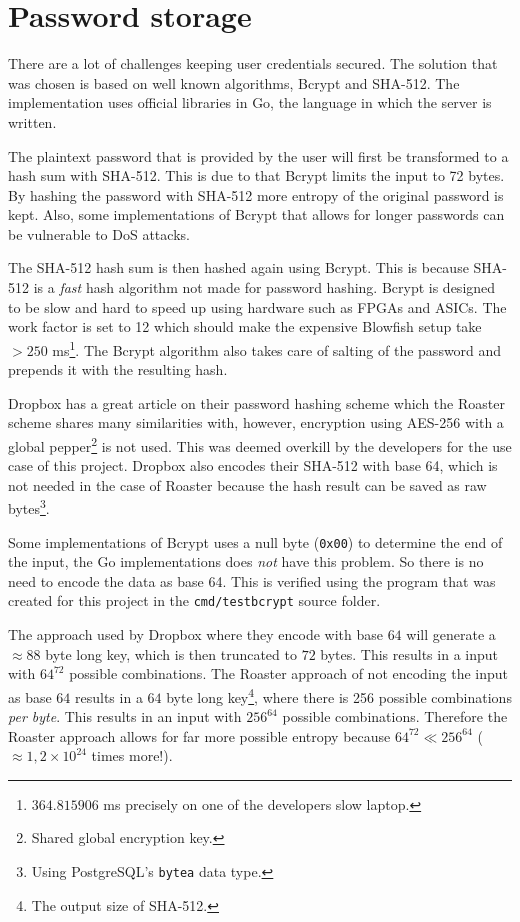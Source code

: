 \documentclass[12pt,a4paper]{report}
\begin{document}
\section{Password storage}
There are a lot of challenges keeping user credentials secured. The solution that was chosen is based on well known algorithms, Bcrypt and SHA-512. The implementation uses official libraries in Go, the language in which the server is written.

The plaintext password that is provided by the user will first be transformed to a hash sum with SHA-512. This is due to that Bcrypt limits the input to 72 bytes. By hashing the password with SHA-512 more entropy of the original password is kept. Also, some implementations of Bcrypt that allows for longer passwords can be vulnerable to DoS attacks\cite{bcrypt-length}.

The SHA-512 hash sum is then hashed again using Bcrypt. This is because
SHA-512 is a \textit{fast} hash algorithm not made for password hashing. Bcrypt is
designed to be slow and hard to speed up using hardware such as FPGAs and
ASICs. The work factor is set to 12 which should make the expensive Blowfish
setup take $> 250$ ms\footnote{$364.815906$ ms precisely on one of the developers slow laptop.}.
The Bcrypt algorithm also takes care of salting of the password and prepends
it with the resulting hash.


Dropbox has a great article\cite{dropbox-passwords} on their password hashing scheme
which the Roaster scheme shares many similarities with, however, encryption using AES-256
with a global pepper\footnote{Shared global encryption key.} is not used. This was deemed overkill
by the developers for the use case of this project. Dropbox also encodes their SHA-512 with base 64,
which is not needed in the case of Roaster because the hash result can be saved as raw
bytes\footnote{Using PostgreSQL's \texttt{bytea} data type.}.

Some implementations of Bcrypt uses a null byte (\texttt{0x00}) to determine the end
of the input\cite{bcrypt-bug}, the Go implementations does \textit{not} have this problem. So there
is no need to encode the data as base 64. This is verified using the program that was created for
this project in the \texttt{cmd/testbcrypt} source folder.

The approach used by Dropbox where they encode with base $64$ will generate a
$\approx 88$ byte long key, which is then truncated to $72$ bytes. This results in a
input with $64^{72}$ possible combinations. The Roaster approach of not encoding the
input as base $64$ results in a $64$ byte long key\footnote{The output size of SHA-512.},
where there is 256 possible combinations \textit{per byte}. This results in an input
with $256^{64}$ possible combinations. Therefore the Roaster approach allows for far more
possible entropy because $64^{72} \ll 256^{64}$ ($\approx 1,2 \times 10^{24}$ times more!).
\end{document}
